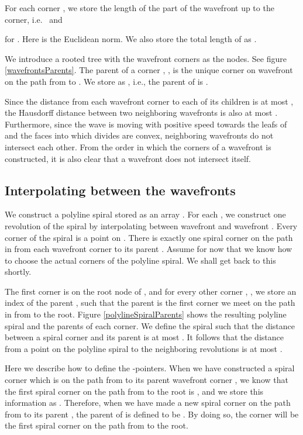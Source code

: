 \documentclass[3p]{elsarticle}
\begin{document}
For each corner , we store the length of the part of the
wavefront up to the corner, i.e.~ and

for . Here  is the Euclidean norm. We also store the total length of
 as .


We introduce a rooted tree with the wavefront corners as the nodes.
See figure \ref{wavefrontsParents}.
The parent of a corner , , is the
unique corner  on wavefront  on the path from
 to .
We store  as , i.e.,
the parent of  is .

Since the distance from each wavefront corner to each of its children is at most ,
the Hausdorff distance between two neighboring wavefronts is also at most .
Furthermore, since the wave is moving with positive speed towards the leafs of  and the faces
into which  divides  are convex, neighboring wavefronts do not intersect each other.
From the order in which the corners of a wavefront is constructed, it is also clear that
a wavefront does not intersect itself.

\subsection{Interpolating between the wavefronts}\label{interpolating}

We construct a polyline spiral stored as an array . For each , we construct one
revolution of the spiral by interpolating between wavefront  and wavefront . Every
corner of the spiral is a point on . There is exactly one spiral corner
on the path in  from each wavefront corner  to its parent
.
Assume for now that we know how to choose the actual corners of the polyline spiral. We shall get
back to this shortly.

The first corner  is on the root node of , and for every other
corner , , we store an index of the parent ,
such that the parent 
is the first corner we meet on the path in  from  to the root.
Figure \ref{polylineSpiralParents} shows the resulting polyline spiral and the parents of each corner.
We define the spiral
such that the distance between a spiral corner and its parent is at most . It follows that
the distance from a point on the polyline spiral to the neighboring revolutions is at most .

Here we describe how to define the -pointers.
When we have constructed
a spiral corner  which is on the path from  to its parent wavefront
corner , we know that the first spiral corner on the path from
 to the root is , and we store this information as
.
Therefore, when we have made a new spiral corner  on the path from 
to its parent , the parent of  is defined to be
. By doing so, the corner
 will be
the first spiral corner on the path from  to the root.
\end{document}
